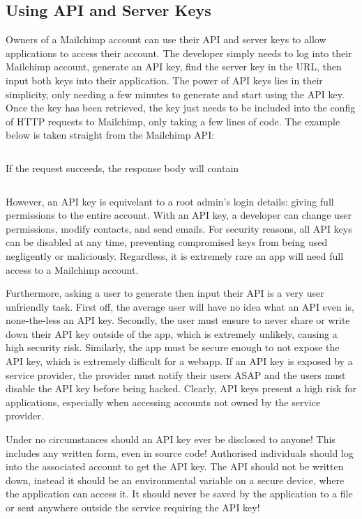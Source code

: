 \documentclass[11pt]{article}
\begin{document}
\subsection{Using API and Server Keys}

Owners of a Mailchimp account can use their API and server keys to allow applications to access their account. The developer simply needs to log into their Mailchimp account, generate an API key, find the server key in the URL, then input both keys into their application. The power of API keys lies in their simplicity, only needing a few minutes to generate and start using the API key. Once the key has been retrieved, the key just needs to be included into the config of HTTP requests to Mailchimp, only taking a few lines of code. The example below is taken straight from the Mailchimp API:

\inputminted[linenos=true]{python}{mailchimp_examples/mailchimp_ping.py}

\noindent
If the request succeeds, the response body will contain

\inputminted{json}{mailchimp_examples/ping_response.json}

However, an API key is equivelant to a root admin's login details: giving full permissions to the entire account. With an API key, a developer can change user permissions, modify contacts, and send emails. For security reasons, all API keys can be disabled at any time, preventing compromised keys from being used negligently or maliciously. Regardless, it is extremely rare an app will need full access to a Mailchimp account.

Furthermore, asking a user to generate then input their API is a very user unfriendly task. First off, the average user will have no idea what an API even is, none-the-less an API key. Secondly, the user must ensure to never share or write down their API key outside of the app, which is extremely unlikely, causing a high security risk. Similarly, the app must be secure enough to not expose the API key, which is extremely difficult for a webapp. If an API key is exposed by a service provider, the provider must notify their users ASAP and the users must disable the API key before being hacked. Clearly, API keys present a high risk for applications, especially when accessing accounts not owned by the service provider.

\begin{warn}
Under no circumstances should an API key ever be disclosed to anyone! This includes any written form, even in source code! Authorised individuals should log into the associated account to get the API key. The API should not be written down, instead it should be an environmental variable on a secure device, where the application can access it. It should never be saved by the application to a file or sent anywhere outside the service requiring the API key!
\end{warn}
\end{document}
